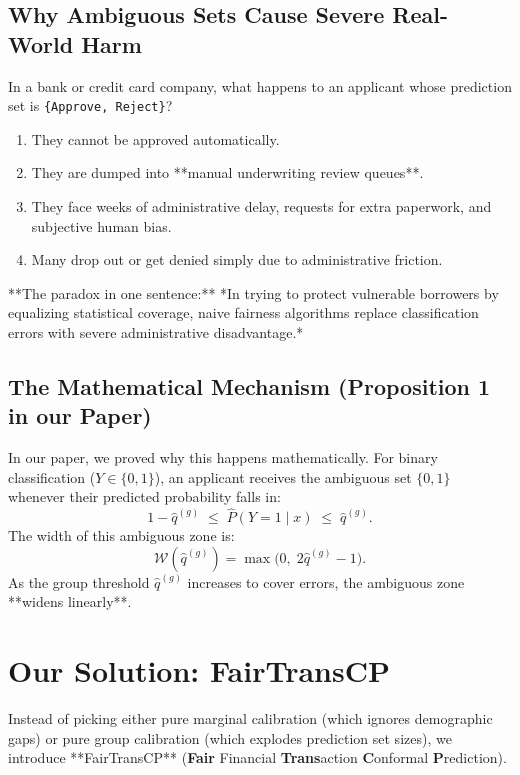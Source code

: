 \documentclass[11pt,a4paper]{article}
\begin{document}
\subsection{Why Ambiguous Sets Cause Severe Real-World Harm}
In a bank or credit card company, what happens to an applicant whose prediction set is \texttt{\{Approve, Reject\}}?
\begin{enumerate}[leftmargin=1.5em]
    \item They cannot be approved automatically.
    \item They are dumped into **manual underwriting review queues**.
    \item They face weeks of administrative delay, requests for extra paperwork, and subjective human bias.
    \item Many drop out or get denied simply due to administrative friction.
\end{enumerate}
**The paradox in one sentence:** *In trying to protect vulnerable borrowers by equalizing statistical coverage, naive fairness algorithms replace classification errors with severe administrative disadvantage.*

\subsection{The Mathematical Mechanism (Proposition 1 in our Paper)}
In our paper, we proved why this happens mathematically. For binary classification ($Y \in \{0, 1\}$), an applicant receives the ambiguous set $\{0, 1\}$ whenever their predicted probability falls in:
\[
1 - \hat{q}^{(g)} \;\le\; \hat{P}(Y=1 \mid x) \;\le\; \hat{q}^{(g)}.
\]
The width of this ambiguous zone is:
\[
\mathcal{W}(\hat{q}^{(g)}) = \max\bigl(0,\; 2\hat{q}^{(g)} - 1\bigr).
\]
As the group threshold $\hat{q}^{(g)}$ increases to cover errors, the ambiguous zone **widens linearly**.

\section{Our Solution: FairTransCP}

Instead of picking either pure marginal calibration (which ignores demographic gaps) or pure group calibration (which explodes prediction set sizes), we introduce **FairTransCP** (\textbf{Fair} Financial \textbf{Trans}action \textbf{C}onformal \textbf{P}rediction).
\end{document}
